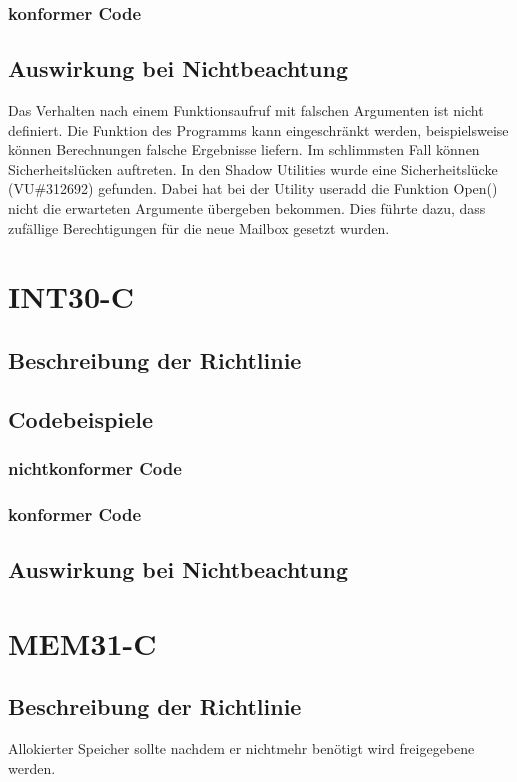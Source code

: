 \documentclass[12pt]{article}
\begin{document}
\subsubsection{konformer Code}



\subsection{Auswirkung bei Nichtbeachtung}
Das Verhalten nach einem Funktionsaufruf mit falschen Argumenten ist nicht definiert. Die Funktion des Programms kann eingeschränkt werden, beispielsweise können Berechnungen falsche Ergebnisse liefern. Im schlimmsten Fall können Sicherheitslücken auftreten. In den Shadow Utilities wurde eine Sicherheitslücke (VU\#312692) gefunden. Dabei hat bei der Utility useradd die Funktion Open() nicht die erwarteten Argumente übergeben bekommen. Dies führte dazu, dass zufällige Berechtigungen für die neue Mailbox gesetzt wurden.


\section{INT30-C}
\subsection{Beschreibung der Richtlinie}
\subsection{Codebeispiele}
\subsubsection{nichtkonformer Code}
\subsubsection{konformer Code}

\subsection{Auswirkung bei Nichtbeachtung}




\section{MEM31-C}
\subsection{Beschreibung der Richtlinie}
Allokierter Speicher sollte nachdem er nichtmehr benötigt wird freigegebene werden.
\end{document}
